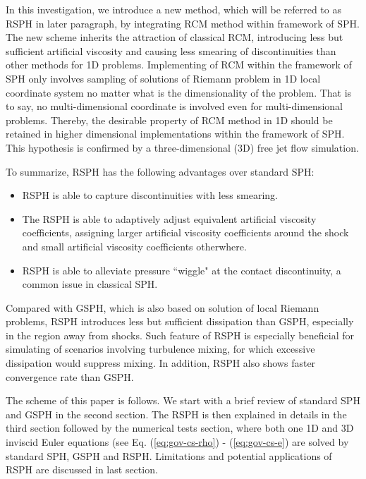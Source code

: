 In this investigation, we introduce a new method, which will be referred to as RSPH in later paragraph, by integrating RCM method within framework of SPH. 
The new scheme inherits the attraction of classical RCM, introducing less but sufficient artificial viscosity and causing less smearing of discontinuities than other methods for 1D problems. Implementing of RCM within the framework of SPH only involves sampling of solutions of Riemann problem in 1D local coordinate system no matter what is the dimensionality of the problem. That is to say, no multi-dimensional coordinate is involved even for multi-dimensional problems. Thereby, the desirable property of RCM method in 1D should be retained in higher dimensional implementations within the framework of SPH. This hypothesis is confirmed by a three-dimensional (3D) free jet flow simulation. 

To summarize, RSPH has the following advantages over standard SPH:
\begin{itemize}
\item RSPH is able to capture discontinuities with less smearing.
\item The RSPH is able to adaptively adjust equivalent artificial viscosity coefficients, assigning larger artificial viscosity coefficients around the shock and small artificial viscosity coefficients otherwhere.
\item RSPH is able to alleviate pressure ``wiggle" at the contact discontinuity, a common issue in classical SPH.
\end{itemize}
Compared with GSPH, which is also based on solution of local Riemann problems, RSPH introduces less but sufficient dissipation than GSPH, especially in the region away from shocks. Such feature of RSPH is especially beneficial for simulating of scenarios involving turbulence mixing, for which excessive dissipation would suppress mixing. In addition, RSPH also shows faster convergence rate than GSPH.

The scheme of this paper is follows. We start with a brief review of standard SPH and GSPH in the second section. The RSPH is then explained in details in the third section followed by the numerical tests section, where both one 1D and 3D inviscid Euler equations (see Eq. (\ref{eq:gov-cs-rho}) - (\ref{eq:gov-cs-e}) are solved by standard SPH, GSPH and RSPH. Limitations and potential applications of RSPH are discussed in last section. 

